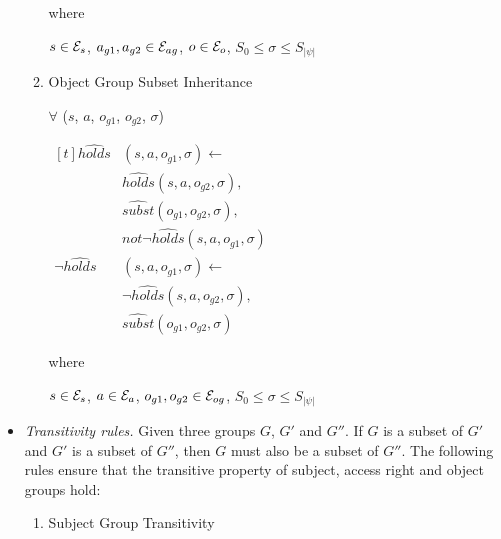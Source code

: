\documentclass[global,twocolumn,draft]{svjour}
\begin{document}
\begin{itemize}
\begin{enumerate}
                  where
 
                  $s \in {\cal E}_{s}$,
                  $a_{g1}, a_{g2} \in {\cal E}_{ag}$,
                  $o \in {\cal E}_{o}$,
                  $S_{0} \leq \sigma \leq S_{|\psi|}$
 
                \item
                  Object Group Subset Inheritance
 
                  $\forall$ ($s$, $a$, $o_{g1}$, $o_{g2}$, $\sigma$)

                  \begin{math}
                    \begin{aligned}[t]
                      \hat{holds}&(s, a, o_{g1}, \sigma) \leftarrow \\
                      & \hat{holds}(s, a, o_{g2}, \sigma), \\
                      & \hat{subst}(o_{g1}, o_{g2}, \sigma), \\
                      & not \lnot \hat{holds}(s, a, o_{g1}, \sigma) \\
                      \lnot \hat{holds}&(s, a, o_{g1}, \sigma) \leftarrow \\
                      & \lnot \hat{holds}(s, a, o_{g2}, \sigma), \\
                      & \hat{subst}(o_{g1}, o_{g2}, \sigma)
                    \end{aligned}
                  \end{math}

                  where
 
                  $s \in {\cal E}_{s}$,
                  $a \in {\cal E}_{a}$,
                  $o_{g1}, o_{g2} \in {\cal E}_{og}$,
                  $S_{0} \leq \sigma \leq S_{|\psi|}$
              \end{enumerate}

            \item
              {\em Transitivity rules.}
              Given three groups $G$, $G'$ and $G''$. If $G$ is a subset of
              $G'$ and $G'$ is a subset of $G''$, then $G$ must also be a
              subset of $G''$. The following rules ensure that the transitive
              property of subject, access right and object groups hold:

              \begin{enumerate}
                \item
                  Subject Group Transitivity
 

\end{enumerate}
\end{itemize}
\end{document}
